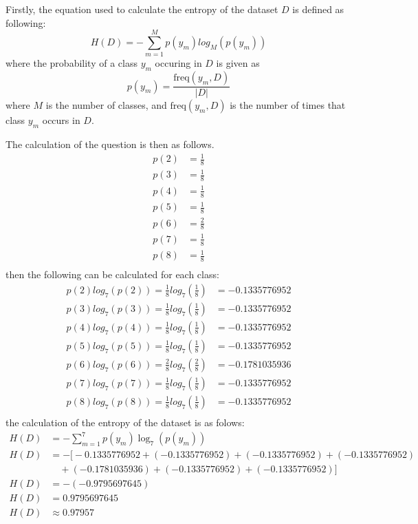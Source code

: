 \documentclass[10pt]{article}
\begin{document}
Firstly, the equation used to calculate the entropy of the dataset $D$ is defined as following:
\begin{equation*}
    H(D) = - \sum_{m=1}^{M} p(y_m)log_M \left( p(y_m) \right)
\end{equation*}
where the probability of a class $y_m$ occuring in $D$ is given as
\begin{equation*}
    p(y_m) = \frac{\text{freq}(y_m, D)}{|D|}
\end{equation*}
where $M$ is the number of classes, and $\text{freq}(y_m, D)$ is the number of times that class $y_m$
occurs in $D$.

The calculation of the question is then as follows.
\begin{align*}
    p(2) &= \frac{1}{8} \\
    p(3) &= \frac{1}{8} \\
    p(4) &= \frac{1}{8} \\
    p(5) &= \frac{1}{8} \\
    p(6) &= \frac{2}{8} \\
    p(7) &= \frac{1}{8} \\
    p(8) &= \frac{1}{8} \\
\end{align*}
then the following can be calculated for each class:
\begin{align*}
    p(2) log_7 \left( p(2) \right) = \frac{1}{8} log_7 \left( \frac{1}{8} \right) &= -0.1335776952\\
    p(3) log_7 \left( p(3) \right) = \frac{1}{8} log_7 \left( \frac{1}{8} \right) &= -0.1335776952\\
    p(4) log_7 \left( p(4) \right) = \frac{1}{8} log_7 \left( \frac{1}{8} \right) &= -0.1335776952\\
    p(5) log_7 \left( p(5) \right) = \frac{1}{8} log_7 \left( \frac{1}{8} \right) &= -0.1335776952\\
    p(6) log_7 \left( p(6) \right) = \frac{2}{8} log_7 \left( \frac{2}{8} \right) &= -0.1781035936\\
    p(7) log_7 \left( p(7) \right) = \frac{1}{8} log_7 \left( \frac{1}{8} \right) &= -0.1335776952\\
    p(8) log_7 \left( p(8) \right) = \frac{1}{8} log_7 \left( \frac{1}{8} \right) &= -0.1335776952\\
\end{align*}
the calculation of the entropy of the dataset is as folows:
\begin{align*}
    H(D) &= - \sum_{m=1}^{7} p(y_m) \log_7 \left( p(y_m) \right) \\
    H(D) &= - \big[ -0.1335776952 + (-0.1335776952) + (-0.1335776952) + (-0.1335776952)\\
    &\quad + (-0.1781035936) + (-0.1335776952) + (-0.1335776952)\big] \\
    H(D) &= - (-0.9795697645) \\
    H(D) &= 0.9795697645 \\
    H(D) &\approx 0.97957
\end{align*}
\end{document}
